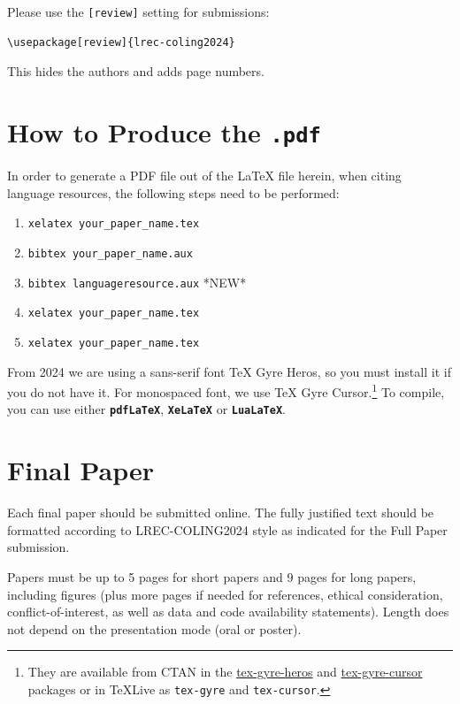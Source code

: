 \documentclass[10pt, a4paper]{article}
\begin{document}
Please use the \texttt{[review]} setting for submissions:

\begin{verbatim}
\usepackage[review]{lrec-coling2024}
\end{verbatim}

This hides the authors and adds page numbers.

\section{How to Produce the \texttt{.pdf}}
\label{sec:append-how-prod}


In order to generate a PDF file out of the LaTeX file herein, when citing language resources, the following steps need to be performed:

\begin{enumerate}
\item \texttt{xelatex your\_paper\_name.tex}
\item \texttt{bibtex your\_paper\_name.aux}
\item \texttt{bibtex languageresource.aux}    *NEW*
\item \texttt{xelatex your\_paper\_name.tex}
\item \texttt{xelatex your\_paper\_name.tex}
\end{enumerate}

From 2024 we are using a sans-serif font TeX Gyre Heros, so you must
install it if you do not have it.  For monospaced font, we use TeX
Gyre Cursor.\footnote{They are available from CTAN in the
  \href{https://ctan.org/pkg/tex-gyre-heros}{tex-gyre-heros} and
  \href{https://ctan.org/pkg/tex-gyre-cursor}{tex-gyre-cursor} packages
    or in TeXLive as \texttt{tex-gyre} and \texttt{tex-cursor}.}  To
  compile, you can use either \textbf{\texttt{pdfLaTeX}},
  \textbf{\texttt{XeLaTeX}} or \textbf{\texttt{LuaLaTeX}}.

\section{Final Paper}

Each final paper should be submitted online. The fully justified text should be formatted according to LREC-COLING2024 style as indicated for the Full Paper submission.

Papers must be up to 5 pages for short papers and 9 pages for long
papers, including figures (plus more pages if needed for references,
ethical consideration, conflict-of-interest, as well as data and code
availability statements).  Length does not depend on the presentation
mode (oral or poster).
\end{document}
